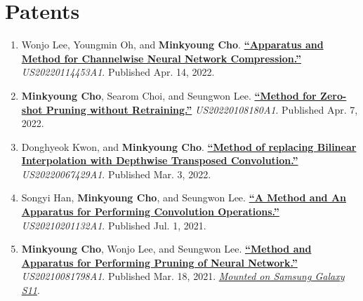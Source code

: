 \documentclass[letterpaper,oneside,11pt]{article}
\begin{document}
\section{Patents}
\begin{enumerate}[leftmargin=*, itemsep=0em]
  \item \small Wonjo Lee, Youngmin Oh, and \textbf{Minkyoung Cho}. \textbf{\href{https://patentimages.storage.googleapis.com/82/b3/b5/3652b77fd7fe2a/US20220114453A1.pdf}{``Apparatus and Method for Channelwise Neural Network Compression.''}} \textit{US20220114453A1}. Published Apr. 14, 2022.
  \item \small \textbf{Minkyoung Cho}, Searom Choi, and Seungwon Lee. \textbf{\href{https://patentimages.storage.googleapis.com/2a/76/c3/1436cb6d759f01/US20220108180A1.pdf}{``Method for Zero-shot Pruning without Retraining.''}} \textit{US20220108180A1}. Published Apr. 7, 2022.
  \item \small Donghyeok Kwon, and \textbf{Minkyoung Cho}. \textbf{\href{https://patentimages.storage.googleapis.com/65/93/b5/0087b1b6fdf1bd/US20220067429A1.pdf}{``Method of replacing Bilinear Interpolation with Depthwise Transposed Convolution.''}} \textit{US20220067429A1}. Published Mar. 3, 2022.
  \item \small Songyi Han, \textbf{Minkyoung Cho}, and Seungwon Lee. \textbf{\href{https://patentimages.storage.googleapis.com/d4/9e/74/0f46f5127f65e5/US20210201132A1.pdf}{``A Method and An Apparatus for Performing Convolution Operations.''}} \textit{US20210201132A1}. Published Jul. 1, 2021.
  \item \small \textbf{Minkyoung Cho}, Wonjo Lee, and Seungwon Lee. \textbf{\href{https://patentimages.storage.googleapis.com/c1/cb/54/45c128411b5489/US20210081798A1.pdf}{``Method and Apparatus for Performing Pruning of Neural Network.''}} \textit{US20210081798A1}. Published Mar. 18, 2021. \underline{\textsl{Mounted on Samsung Galaxy S11}}.   
\end{enumerate}
  
\end{document}
